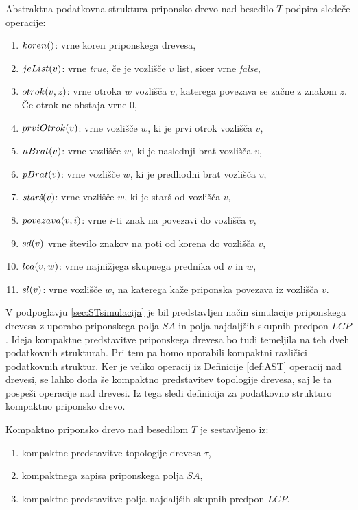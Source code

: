 \begin{defi}\label{def:AST}
    Abstraktna podatkovna struktura priponsko drevo nad besedilo $T$ podpira sledeče operacije:
    \newpage
    \begin{enumerate}
        \item $\Koren$: vrne koren priponskega drevesa,
        \item $\List{v}$: vrne \textit{true}, če je vozlišče $v$ list, sicer vrne \textit{false},
        \item $\Otrok{v}{z}$: vrne otroka $w$ vozlišča $v$, katerega povezava se začne z znakom $z$. Če otrok ne obstaja vrne 0,
        \item $\PrviOtrok{v}$: vrne vozlišče $w$, ki je prvi otrok vozlišča $v$,
        \item $\NBrat{v}$: vrne vozlišče $w$, ki je naslednji brat vozlišča $v$,
        \item $\PBrat{v}$: vrne vozlišče $w$, ki je predhodni brat vozlišča $v$,
        \item $\Stars{v}$: vrne vozlišče $w$, ki je starš od vozlišča $v$,
        \item $\Povezava{v}{i}$: vrne $i$-ti znak na povezavi do vozlišča $v$,
        \item $\Sd{v}$ vrne število znakov na poti od korena do vozlišča $v$,
        \item $\Lca{v}{w}$: vrne najnižjega skupnega prednika od $v$ in $w$,
        \item $\Sl{v}$: vrne vozlišče $w$, na katerega kaže priponska povezava iz vozlišča $v$.
    \end{enumerate}
\end{defi}

V podpoglavju \ref{sec:STsimulacija} je bil predstavljen način simulacije priponskega drevesa z uporabo priponskega polja $SA$ in polja najdaljših skupnih predpon $LCP$. Ideja kompaktne predstavitve priponskega drevesa bo tudi temeljila na teh dveh podatkovnih strukturah. Pri tem pa bomo uporabili kompaktni različici podatkovnih struktur. Ker je veliko operacij iz Definicije \ref{def:AST} operacij nad drevesi, se lahko doda še kompaktno predstavitev topologije drevesa, saj le ta pospeši operacije nad drevesi. Iz tega sledi definicija za podatkovno strukturo kompaktno priponsko drevo.

\begin{defi}
    Kompaktno priponsko drevo nad besedilom $T$ je sestavljeno iz:
    \begin{enumerate}
        \item kompaktne predstavitve topologije drevesa $\tau$,
        \item kompaktnega zapisa priponskega polja $SA$, %
        \item kompaktne predstavitve polja najdaljših skupnih predpon $LCP$.
    \end{enumerate}
\end{defi}

